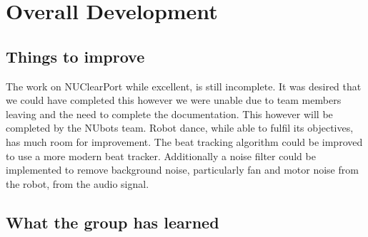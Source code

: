 \documentclass[english,12pt]{scrartcl}
\begin{document}
\section{Overall Development}
	\subsection{Things to improve}
		The work on NUClearPort while excellent, is still incomplete.
		It was desired that we could have completed this however we were unable due to team members leaving and the need to complete the documentation.
		This however will be completed by the NUbots team.
		Robot dance, while able to fulfil its objectives, has much room for improvement.
		The beat tracking algorithm could be improved to use a more modern beat tracker.
		Additionally a noise filter could be implemented to remove background noise, particularly fan and motor noise from the robot, from the audio signal.
	
	\subsection{What the group has learned}
	
\end{document}

